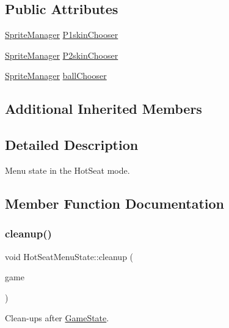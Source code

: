 \subsection*{Public Attributes}
\begin{DoxyCompactItemize}
\item 
\mbox{\hyperlink{class_sprite_manager}{Sprite\+Manager}} \mbox{\hyperlink{class_hot_seat_menu_state_afe57c9d8f34baf40c000723a7593db48}{P1skin\+Chooser}}
\item 
\mbox{\hyperlink{class_sprite_manager}{Sprite\+Manager}} \mbox{\hyperlink{class_hot_seat_menu_state_a9ffea759e40ba0bc41c2a3afd72b783e}{P2skin\+Chooser}}
\item 
\mbox{\hyperlink{class_sprite_manager}{Sprite\+Manager}} \mbox{\hyperlink{class_hot_seat_menu_state_a5bb9a6757abc66a4b40329feb31c136b}{ball\+Chooser}}
\end{DoxyCompactItemize}
\subsection*{Additional Inherited Members}


\subsection{Detailed Description}
Menu state in the Hot\+Seat mode. 

\subsection{Member Function Documentation}
\mbox{\label{class_hot_seat_menu_state_ada87b1a00943777a31b8b24ddf347350}} 
\subsubsection{\texorpdfstring{cleanup()}{cleanup()}}
{\footnotesize\ttfamily void Hot\+Seat\+Menu\+State\+::cleanup (\begin{DoxyParamCaption}\item[{\mbox{\hyperlink{class_game_engine}{Game\+Engine}} $\ast$}]{game }\end{DoxyParamCaption})\hspace{0.3cm}{\ttfamily [virtual]}}



Clean-\/ups after \mbox{\hyperlink{class_game_state}{Game\+State}}. 



